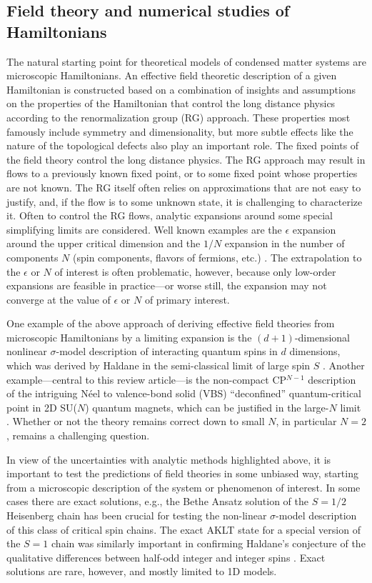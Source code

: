 \documentclass[10pt,pre,aps,twocolumn,showpacs,superscriptaddress,floatfix]{revtex4-1}
\begin{document}
\subsection{Field theory and numerical studies of Hamiltonians}

The natural starting point for theoretical models of condensed matter systems are microscopic Hamiltonians.
An effective field theoretic description  of a given Hamiltonian 
is constructed based on a combination of insights and assumptions on the properties of the Hamiltonian that control the long distance physics according to the renormalization group (RG) approach. These properties most famously include symmetry and dimensionality, but more subtle effects like the nature of the topological defects also play an important role.  The fixed points of the field theory control the long distance physics.
The RG approach may result in flows to a previously known fixed point, or to some fixed point
whose properties are not known. The RG itself often relies on approximations that are not easy
to justify, and, if the flow is to some unknown state, it is challenging to characterize it. 
Often to control the RG flows, analytic expansions around some special simplifying limits are considered. Well known examples are the $\epsilon$ expansion
around the upper critical dimension and the $1/N$ expansion in the number of components $N$ (spin components, flavors of fermions, etc.)
\cite{herbut2007:book,barber1972:lgNeps}. The
extrapolation to the $\epsilon$ or $N$ of interest is often problematic, however, because only low-order
expansions are feasible in practice---or worse still, the expansion may not converge at the value of $\epsilon$ or $N$ of primary interest.

One example of the above approach of deriving effective field theories from microscopic Hamiltonians by a limiting expansion is the $(d+1)$-dimensional
nonlinear $\sigma$-model description of interacting quantum spins in $d$ dimensions, which was derived by Haldane in 
the semi-classical limit of large spin $S$ \cite{Haldane83,Chakravarty89,Auerbach94}.  Another example---central to this review article---is the 
non-compact CP$^{N-1}$ description of the intriguing  N\'eel to valence-bond solid (VBS) ``deconfined'' quantum-critical point in 2D 
SU($N$) quantum magnets, which can be justified in the large-$N$ limit \cite{Senthil04a,Sachdev08}. Whether or not the theory remains correct down to 
small $N$, in particular $N=2$, remains a challenging question.

In view of the uncertainties with analytic methods highlighted above, it is important to test the predictions of field theories in some unbiased way,
starting from a microscopic description of the system or phenomenon of interest. In some cases there are exact solutions, 
e.g., the Bethe Ansatz solution of the $S=1/2$ Heisenberg chain \cite{Bethe31} has been crucial for testing 
the non-linear $\sigma$-model description of this class of critical spin chains. The exact AKLT state \cite{affleck88} for a special 
version of the $S=1$ chain was similarly important in confirming Haldane's conjecture of the qualitative differences between 
half-odd integer and integer spins \cite{Haldane83}. Exact solutions are rare, however, and mostly limited to 1D models.
 
\end{document}
